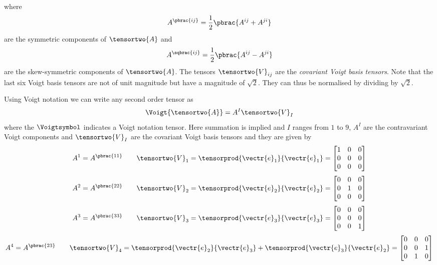 where
\begin{equation}
  A^{\pbrac{ij}}=\dfrac{1}{2}\pbrac{A^{ij}+A^{ji}}
\end{equation}
are the symmetric components of $\tensortwo{A}$ and
\begin{equation}
  A^{\sqbrac{ij}}=\dfrac{1}{2}\pbrac{A^{ij}-A^{ji}}
\end{equation}
are the skew-symmetric components of $\tensortwo{A}$. The tensors
$\tensortwo{V}_{ij}$ are the \emph{covariant Voigt basis
tensors}. Note that the last six Voigt basis tensors are not of unit
magnitude but have a magnitude of $\sqrt{2}$. They can thus be
normalised by dividing by $\sqrt{2}$.

Using Voigt notation we can write any second order tensor as
\begin{equation}
  \Voigt{\tensortwo{A}}=A^{I}\tensortwo{V}_{I}
\end{equation}
where the $\Voigtsymbol$ indicates a Voigt notation tensor. Here
summation is implied and $I$ ranges from $1$ to $9$, $A^{I}$ are the
contravariant Voigt components and $\tensortwo{V}_{I}$ are the covariant
Voigt basis tensors and they are given by
\begin{equation}
  A^{1}=A^{\pbrac{11}} \qquad
  \tensortwo{V}_{1}=\tensorprod{\vectr{e}_{1}}{\vectr{e}_{1}}=\begin{bmatrix}
  1 & 0 & 0 \\
  0 & 0 & 0 \\
  0 & 0 & 0
  \end{bmatrix}
\end{equation}
\begin{equation}
  A^{2}=A^{\pbrac{22}} \qquad
  \tensortwo{V}_{2}=\tensorprod{\vectr{e}_{2}}{\vectr{e}_{2}}=\begin{bmatrix}
  0 & 0 & 0 \\
  0 & 1 & 0 \\
  0 & 0 & 0
  \end{bmatrix}
\end{equation}
\begin{equation}
  A^{3}=A^{\pbrac{33}} \qquad
  \tensortwo{V}_{3}=\tensorprod{\vectr{e}_{3}}{\vectr{e}_{3}}=\begin{bmatrix}
  0 & 0 & 0 \\
  0 & 0 & 0 \\
  0 & 0 & 1
  \end{bmatrix}
\end{equation}
\begin{equation}
  A^{4}=A^{\pbrac{23}} \qquad
  \tensortwo{V}_{4}=\tensorprod{\vectr{e}_{2}}{\vectr{e}_{3}}+\tensorprod{\vectr{e}_{3}}{\vectr{e}_{2}}=\begin{bmatrix}
  0 & 0 & 0 \\
  0 & 0 & 1 \\
  0 & 1 & 0
  \end{bmatrix}
\end{equation}
